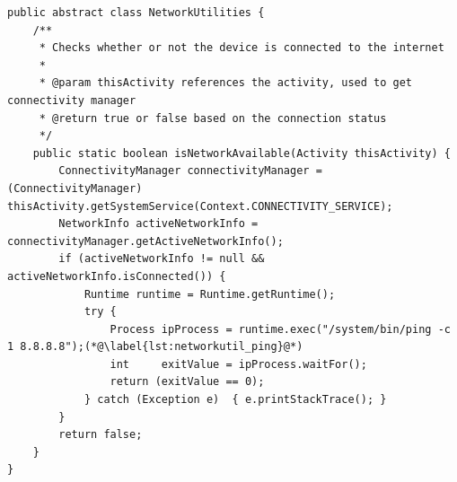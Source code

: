 \begin{lstlisting}[float, floatplacement=h!, caption={The class from the \texttt{giraf-component} library where network utilities are implemented, such as the method used to check if a connection to the internet is available}, label={lst:networkutil}]
public abstract class NetworkUtilities {
    /**
     * Checks whether or not the device is connected to the internet
     *
     * @param thisActivity references the activity, used to get connectivity manager
     * @return true or false based on the connection status
     */
    public static boolean isNetworkAvailable(Activity thisActivity) {
        ConnectivityManager connectivityManager = (ConnectivityManager) thisActivity.getSystemService(Context.CONNECTIVITY_SERVICE);
        NetworkInfo activeNetworkInfo = connectivityManager.getActiveNetworkInfo();
        if (activeNetworkInfo != null && activeNetworkInfo.isConnected()) {
            Runtime runtime = Runtime.getRuntime();
            try {
                Process ipProcess = runtime.exec("/system/bin/ping -c 1 8.8.8.8");(*@\label{lst:networkutil_ping}@*)
                int     exitValue = ipProcess.waitFor();
                return (exitValue == 0);
            } catch (Exception e)  { e.printStackTrace(); }
        }
        return false;
    }
}
\end{lstlisting}

